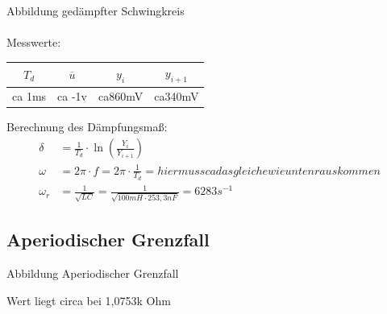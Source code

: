 \documentclass{article}
\begin{document}
Abbildung gedämpfter Schwingkreis\\\\

Messwerte:
\begin{table}[h]
  \begin{center}

    \begin{tabular}{|c|c|c|c|}
      \hline
        $T_d$ &$\overline{u}$ & $y_i$  & $y_{i+1}$\\
      \hline
             ca 1ms&    ca -1v&   ca860mV  &    ca340mV    \\         
      \hline
    \end{tabular}
  \end{center}
\end{table}
Berechnung des Dämpfungsmaß:
\begin{align*}
  \delta &= \frac{1}{T_d} \cdot \ln \left(\frac{Y_i}{Y_{i+1}}\right)\\
  \omega &= 2\pi \cdot f = 2\pi \cdot \frac{1}{T_d} = hier muss ca das gleiche wie unten rauskommen \\
  \omega_r &= \frac{1}{\sqrt{LC}} = \frac{1}{\sqrt{100mH \cdot 253,3nF}} = 6283 s^{-1}
\end{align*}


\subsection{Aperiodischer Grenzfall}

Abbildung Aperiodischer Grenzfall

Wert liegt circa bei 1,0753k Ohm
\end{document}

